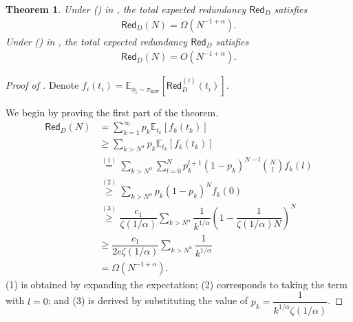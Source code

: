 \documentclass[11pt]{article}
\theoremstyle{plain}
\newtheorem{theorem}{Theorem}[section]
\theoremstyle{definition}
\newcommand{\basemeasure}{\pi_{\text{knw}}}
\newcommand{\dataerror}{\mathsf{Red}_D}
\newcommand{\testdataerror}{\mathsf{Red}_D}
\begin{document}
\begin{theorem}
\label{thm: data scaling lower bound}
Under (\uppercase\expandafter{}) in , the total expected redundancy $\testdataerror$ satisfies
    \begin{align*}
    \testdataerror(N) = \Omega(N^{-1+\alpha}).
\end{align*}
Under (\uppercase\expandafter{}) in , the total expected redundancy $\testdataerror$ satisfies
    \begin{align*}
    \testdataerror(N) = O(N^{-1+\alpha}).
\end{align*}
\end{theorem}
\begin{proof}[Proof of ]
Denote $f_i(t_i)=\mathbb{E}_{\phi_i\sim \basemeasure}[\dataerror^{(i)}(t_i)]$.

We begin by proving the first part of the theorem.
    \begin{align*}
        \testdataerror(N)&=\sum\limits_{k=1}^{\infty} p_k \mathbb{E}_{t_k}[f_k(t_k)]
        \\&\ge \sum\limits_{k> N^{\alpha}} p_k\mathbb{E}_{t_k}[f_k(t_k)] 
        \\& \overset{(1)}{=} \sum\limits_{k> N^{\alpha}}\sum\limits_{l=0}^N p_k^{l+1} (1-p_k)^{N-l}\binom{N}{l}f_k(l) \\
        &\overset{(2)}{\ge} \sum\limits_{k> N^{\alpha}} p_k (1-p_k)^{N} f_k(0)\\
        &\overset{(3)}{\ge} \dfrac{c_1}{\zeta(1/\alpha)}\sum\limits_{k> N^{\alpha}} \dfrac{1}{k^{1/\alpha}} \left(1-\dfrac{1}{\zeta(1/\alpha)N}\right)^{N} \\
        &\ge \dfrac{c_1}{2e\zeta(1/\alpha)}\sum\limits_{k> N^{\alpha}} \dfrac{1}{k^{1/\alpha}} \\
        &=  \Omega(N^{-1+\alpha}).
    \end{align*}
(1) is obtained by expanding the expectation; (2) corresponds to taking the term with $l = 0$; and (3) is derived by substituting the value of $p_k=\dfrac{1}{k^{1/\alpha}\zeta(1/\alpha)}$.



    

\end{proof}
\end{document}
